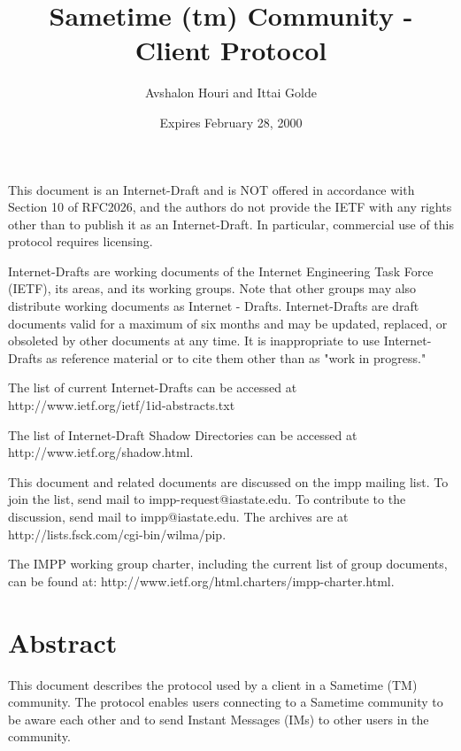 \documentclass[titlepage,oneside]{book}
\title{Sametime (tm) Community - Client Protocol}
\author{Avshalon Houri and Ittai Golde}
\date{Expires February 28, 2000}
\begin{document}
\maketitle{}

\tableofcontents{}

\newpage{}

\par{} This document is an Internet-Draft and is NOT
offered in accordance with Section 10 of RFC2026, and the authors do
not provide the IETF with any rights other than to publish it as an
Internet-Draft. In particular, commercial use of this protocol
requires licensing.

\par{} Internet-Drafts are working documents of the Internet
Engineering Task Force (IETF), its areas, and its working groups.
Note that other groups may also distribute working documents as
Internet - Drafts. Internet-Drafts are draft documents valid for a
maximum of six months and may be updated, replaced, or obsoleted by
other documents at any time. It is inappropriate to use
Internet-Drafts as reference material or to cite them other than as
"work in progress."

\par{} The list of current Internet-Drafts can be accessed at
http://www.ietf.org/ietf/1id-abstracts.txt

\par{} The list of Internet-Draft Shadow Directories can be accessed
at http://www.ietf.org/shadow.html.

\par{} This document and related documents are discussed on the impp
mailing list. To join the list, send mail to impp-request@iastate.edu.
To contribute to the discussion, send mail to impp@iastate.edu.  The
archives are at http://lists.fsck.com/cgi-bin/wilma/pip.

\par{} The IMPP working group charter, including the current list of
group documents, can be found at:
http://www.ietf.org/html.charters/impp-charter.html.

\chapter{Abstract}

\par{} This document describes the protocol used by a client in a
Sametime (TM) community. The protocol enables users connecting to a
Sametime community to be aware each other and to send Instant Messages
(IMs) to other users in the community.
\end{document}
